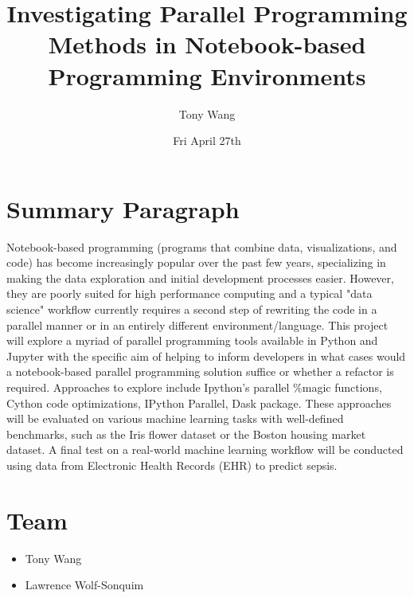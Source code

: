 \documentclass[11pt]{article}
\author{Tony Wang}
\date{Fri April 27th}
\title{Investigating Parallel Programming Methods in Notebook-based Programming Environments}
\begin{document}
\maketitle

\section{Summary Paragraph}
\label{sec:org53f6988}
Notebook-based programming (programs that combine data,
visualizations, and code) has become increasingly popular over the
past few years, specializing in making the data exploration and
initial development processes easier. However, they are poorly suited
for high performance computing and a typical "data science" workflow
currently requires a second step of rewriting the code in a parallel
manner or in an entirely different environment/language. This project
will explore a myriad of parallel programming tools available in
Python and Jupyter with the specific aim of helping to inform
developers in what cases would a notebook-based parallel programming
solution suffice or whether a refactor is required. Approaches to
explore include Ipython's parallel \%magic functions, Cython
code optimizations, IPython Parallel, Dask package. These approaches
will be evaluated on various machine learning tasks with well-defined
benchmarks, such as the Iris flower dataset or the Boston housing
market dataset. A final test on a real-world machine learning workflow
will be conducted using data from Electronic Health Records (EHR) to
predict sepsis.

\section{Team}
\label{sec:org58e4433}
\begin{itemize}
\item Tony Wang
\item Lawrence Wolf-Sonquim
\end{itemize}
\end{document}
